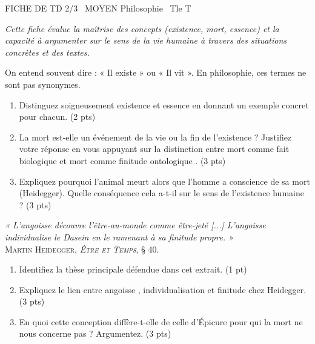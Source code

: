 \documentclass[11pt]{article}
\begin{document}
\begin{tcolorbox}[enhanced,colback=popink,colframe=popink,arc=10pt,boxrule=0pt,left=12pt,right=12pt,top=9pt,bottom=9pt]
{\color{white}\popxbold\small FICHE DE TD 2/3 \textbullet\ MOYEN \hfill Philosophie \textbullet\ Tle T\par}
\end{tcolorbox}
\vspace{4pt}
\noindent \textit{Cette fiche évalue la maîtrise des concepts (existence, mort, essence) et la capacité à argumenter sur le sens de la vie humaine à travers des situations concrètes et des textes.}

\begin{exercice}
On entend souvent dire : « Il existe » ou « Il vit ». En philosophie, ces termes ne sont pas synonymes.
\begin{enumerate}
    \item Distinguez soigneusement \og existence \fg{} et \og essence \fg{} en donnant un exemple concret pour chacun. (2 pts)
    \item La mort est-elle un événement de la vie ou la fin de l'existence ? Justifiez votre réponse en vous appuyant sur la distinction entre \og mort comme fait biologique \fg{} et \og mort comme finitude ontologique \fg{}. (3 pts)
    \item Expliquez pourquoi l'animal \og meurt \fg{} alors que l'homme \og a conscience de sa mort \fg{} (Heidegger). Quelle conséquence cela a-t-il sur le sens de l'existence humaine ? (3 pts)
\end{enumerate}
\end{exercice}

\begin{exercice}
\textit{« L'angoisse découvre l'être-au-monde comme être-jeté [...] L'angoisse individualise le Dasein en le ramenant à sa finitude propre. »} \\
\textsc{Martin Heidegger, \textit{Être et Temps}, § 40.}
\begin{enumerate}
    \item Identifiez la thèse principale défendue dans cet extrait. (1 pt)
    \item Expliquez le lien entre \og angoisse \fg{}, \og individualisation \fg{} et \og finitude \fg{} chez Heidegger. (3 pts)
    \item En quoi cette conception diffère-t-elle de celle d'Épicure pour qui \og la mort ne nous concerne pas \fg{} ? Argumentez. (3 pts)
\end{enumerate}
\end{exercice}
\end{document}
